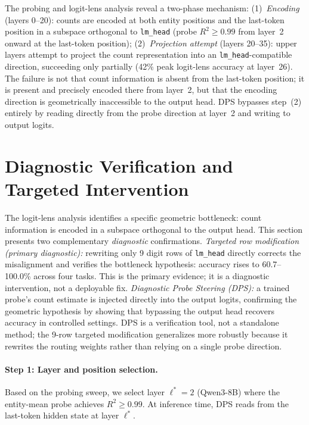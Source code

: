 \documentclass{article}
\begin{document}
The probing and logit-lens analysis reveal a two-phase mechanism:
(1)~\emph{Encoding} (layers 0--20): counts are encoded at both entity positions
and the last-token position in a subspace orthogonal to \texttt{lm\_head}
(probe $R^2 \geq 0.99$ from layer~2 onward at the last-token position);
(2)~\emph{Projection attempt} (layers 20--35): upper layers attempt to project
the count representation into an \texttt{lm\_head}-compatible direction,
succeeding only partially (42\% peak logit-lens accuracy at layer~26).
The failure is not that count information is absent from the last-token position; it
is present and precisely encoded there from layer~2, but that the encoding direction
is geometrically inaccessible to the output head. DPS bypasses step~(2) entirely
by reading directly from the probe direction at layer~2 and writing to output logits.

\section{Diagnostic Verification and Targeted Intervention}
\label{sec:dps}

The logit-lens analysis identifies a specific geometric bottleneck: count information
is encoded in a subspace orthogonal to the output head.
This section presents two complementary \emph{diagnostic} confirmations.
\emph{Targeted row modification (primary diagnostic):} rewriting only 9 digit rows of
\texttt{lm\_head} directly corrects the misalignment and verifies the bottleneck
hypothesis: accuracy rises to 60.7--100.0\% across four tasks.
This is the primary evidence; it is a diagnostic intervention, not a deployable fix.
\emph{Diagnostic Probe Steering (DPS):} a trained probe's count estimate is injected
directly into the output logits, confirming the geometric hypothesis by showing that
bypassing the output head recovers accuracy in controlled settings.
DPS is a verification tool, not a standalone method;
the 9-row targeted modification generalizes more robustly because it rewrites the
routing weights rather than relying on a single probe direction.

\paragraph{Step 1: Layer and position selection.}
Based on the probing sweep, we select layer $\ell^* = 2$ (Qwen3-8B) where the
entity-mean probe achieves $R^2 \geq 0.99$.
At inference time, DPS reads from the last-token hidden state at layer $\ell^*$.
\end{document}
